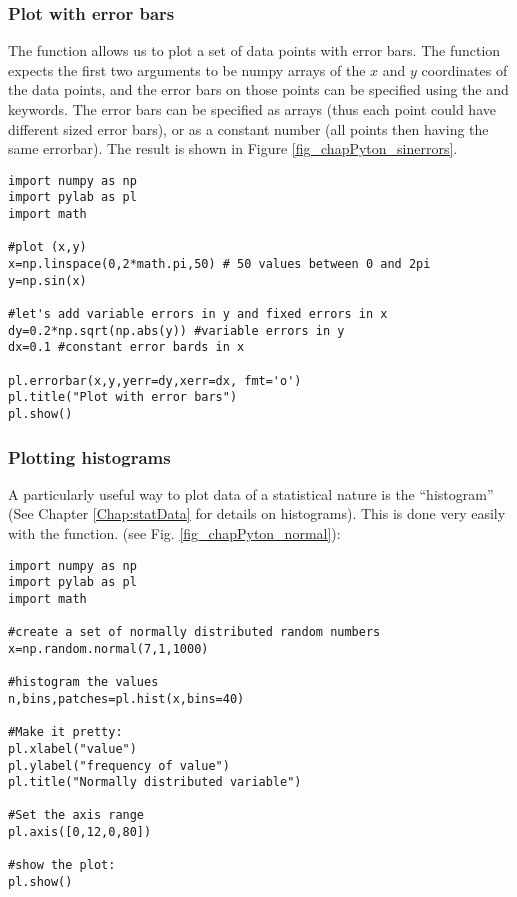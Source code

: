 \subsubsection{Plot with error bars}
The  function allows us to plot a set of data points with error bars. The function expects the first two arguments to be numpy arrays of the $x$ and $y$ coordinates of the data points, and the error bars on those points can be specified using the  and  keywords. The error bars can be specified as arrays (thus each point could have different sized error bars), or as a constant number (all points then having the same errorbar). The result is shown in Figure \ref{fig_chapPyton_sinerrors}.

\begin{lstlisting}[frame=single] 
import numpy as np
import pylab as pl
import math 

#plot (x,y) 
x=np.linspace(0,2*math.pi,50) # 50 values between 0 and 2pi
y=np.sin(x)

#let's add variable errors in y and fixed errors in x
dy=0.2*np.sqrt(np.abs(y)) #variable errors in y
dx=0.1 #constant error bards in x

pl.errorbar(x,y,yerr=dy,xerr=dx, fmt='o') 
pl.title("Plot with error bars")
pl.show()

\end{lstlisting} 

\subsubsection{Plotting histograms}
\label{subsub:pythonhist}
A particularly useful way to plot data of a statistical nature is the ``histogram'' (See Chapter \ref{Chap:statData} for details on histograms). This is done very easily with the  function. (see Fig. \ref{fig_chapPyton_normal}):

\begin{lstlisting}[frame=single] 
import numpy as np
import pylab as pl
import math 

#create a set of normally distributed random numbers
x=np.random.normal(7,1,1000)

#histogram the values
n,bins,patches=pl.hist(x,bins=40)

#Make it pretty:
pl.xlabel("value")
pl.ylabel("frequency of value")
pl.title("Normally distributed variable")

#Set the axis range
pl.axis([0,12,0,80])

#show the plot:
pl.show()

\end{lstlisting} 


